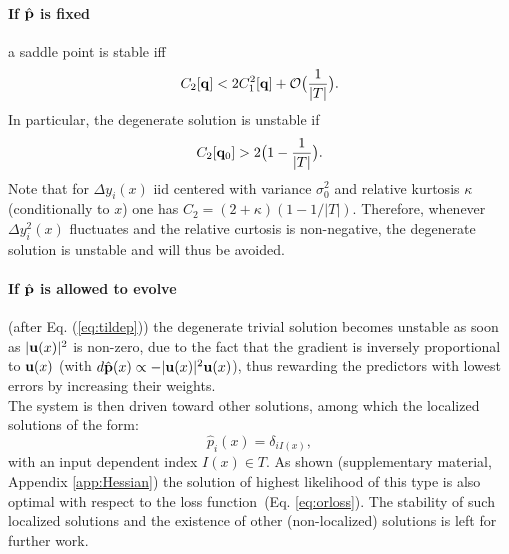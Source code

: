\paragraph{If $\hat {\bf p}$ is fixed} a saddle point is stable iff
\[
C_2[{\bf q}] < 2C_1^2[{\bf q}]+{\cal O}\bigl(\frac{1}{\vert T\vert}\bigr).
\]
In particular, the degenerate solution is unstable if
\[
C_2[{\bf q}_0] > 2\bigl(1-\frac{1}{\vert T\vert}\bigr).
\]
Note that for $\Delta y_i(x)$ iid centered with variance $\sigma_0^2$ and relative kurtosis $\kappa$ (conditionally to $x$)
one has $C_2 = (2+\kappa)(1-1/\vert T\vert)$. Therefore, whenever $\Delta y_i^2(x)$ fluctuates and the relative curtosis is non-negative, %
the  degenerate solution is unstable and will thus be avoided.

\paragraph{If $\hat {\bf p}$ is allowed to evolve} (after Eq. (\ref{eq:tildep})) the degenerate trivial solution becomes unstable as soon as $\vert {\bf u}(x)\vert^2$ is non-zero, due to the fact that the gradient is inversely proportional to ${\bf u}(x)$ (with $d\hat{\bf p}(x)\propto -\vert {\bf u}(x)\vert^2 {\bf u}(x)$), thus rewarding the predictors with lowest errors by increasing their weights. \\

The system is then driven toward other solutions, among which the localized solutions of the form: 
\[
\hat p_i(x) = \delta_{iI(x)},
\]
with an input dependent index $I(x)\in T$. As shown (supplementary material, Appendix \ref{app:Hessian}) the solution of highest likelihood of this type is also optimal with respect to the loss function~(Eq. \ref{eq:orloss}). The stability of such localized solutions and the existence of other (non-localized) solutions is left for further work.  




